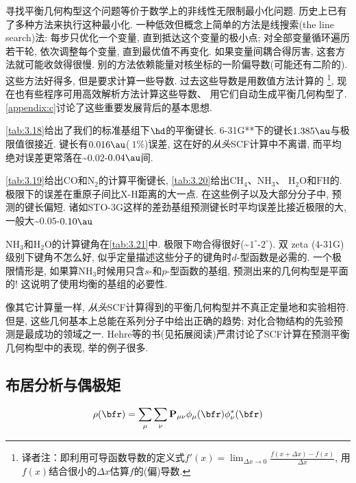 寻找平衡几何构型这个问题等价于数学上的非线性无限制最小化问题.
历史上已有了多种方法来执行这种最小化.
一种低效但概念上简单的方法是线搜索(the line search)法:
每步只优化一个变量,
直到抵达这个变量的极小点;
对全部变量循环遍历若干轮,
依次调整每个变量, 直到最优值不再变化.
如果变量间耦合得厉害, 这套方法就可能收敛得很慢.
别的方法依赖能量对核坐标的一阶偏导数(可能还有二阶的).
这些方法好得多, 但是要求计算一些导数.
过去这些导数是用数值方法计算的
\footnote{译者注：即利用可导函数导数的定义式$f'(x) = \lim_{\Delta x \to 0} \frac{f(x + \Delta x) - f(x)}{\Delta x}$, 用$f(x)$结合很小的$\Delta x$估算$f$的(偏)导数.},
现在也有些程序可用高效解析方法计算这些导数、
用它们自动生成平衡几何构型了.
\autoref{appendix:c}讨论了这些重要发展背后的基本思想.

\autoref{tab:3.18}给出了我们的标准基组下$\hd$的平衡键长.
6-31G**下的键长$1.385\au$与\hft 极限值很接近.
键长有$0.016\au$($~1\%$)误差,
这在好的\emph{从头}SCF计算中不离谱,
而平均绝对误差更常落在\textasciitilde$0.02$-$0.04\au$间.

\autoref{tab:3.19}给出$\mathrm{CO}$和$\mathrm{N}_2$的计算平衡键长,
\autoref{tab:3.20}给出$\mathrm{CH_4}$、$\mathrm{NH_3}$、
$\mathrm{H_2O}$和$\mathrm{FH}$的.
\hft 极限下的误差在重原子间比X-H距离的大一点.
在这些例子以及大部分分子中,
\hft 预测的键长偏短.
诸如STO-3G这样的差劲基组预测键长时平均误差比接近\hft 极限的大,
一般大\textasciitilde$0.05$-$0.10\au$

$\mathrm{NH_3}$和$\mathrm{H_2O}$的计算键角在\autoref{tab:3.21}中.
\hft 极限下吻合得很好(\textasciitilde$1^{\circ}$-$2^{\circ}$).
双 zeta (4-31G)级别下键角不怎么好,
似乎定量描述这些分子的键角时$d$-型函数是必需的.
一个极限情形是, 如果算$\mathrm{NH_3}$时候用只含$s$-和$p$-型函数的基组,
预测出来的几何构型是平面的!
这说明了使用均衡的基组的必要性.

像其它计算量一样,
\emph{从头}SCF计算得到的平衡几何构型并不真正定量地和实验相符.
但是, 这些几何基本上总能在系列分子中给出正确的趋势;
对化合物结构的先验预测是\hft 最成功的领域之一.
Hehre等的书(见拓展阅读)严肃讨论了SCF计算在预测平衡几何构型中的表现,
举的例子很多.

\subsection{布居分析与偶极矩}
\begin{align}
	\rho(\bfr)=\sum_\mu\sum_\nu \mathbf{P}_{\mu\nu}\phi_\mu(\bfr)\phi^*_\nu(\bfr)
\end{align}
